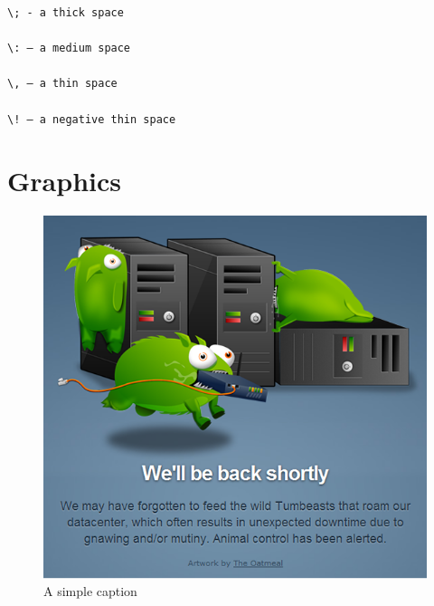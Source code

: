 \documentclass[a4paper,10pt,twocolumn]{article}
\begin{document}
  \begin{verbatim}
\; - a thick space

\: – a medium space

\, – a thin space

\! – a negative thin space 
  \end{verbatim}

\section{Graphics}
  \begin{figure}[ht!]
    \centering
    \includegraphics[scale=0.42]{tumbeasts.png}
    \caption{A simple caption}
    \label{overflow}
  \end{figure}

\end{document}
